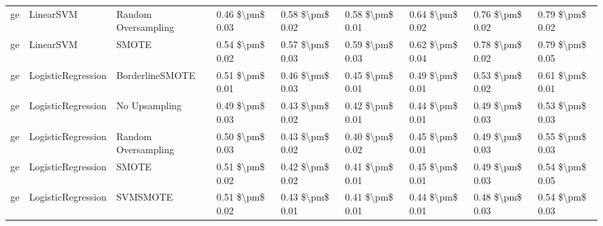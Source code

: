 \begin{tabular}{lllllllll}
      ge &                       LinearSVM &           Random Oversampling &     0.46 \$\textbackslash pm\$ 0.03 &           0.58 \$\textbackslash pm\$ 0.02 &       0.58 \$\textbackslash pm\$ 0.01 &        0.64 \$\textbackslash pm\$ 0.02 &                         0.76 \$\textbackslash pm\$ 0.02 &     0.79 \$\textbackslash pm\$ 0.02 \\
      ge &                       LinearSVM &                         SMOTE &     0.54 \$\textbackslash pm\$ 0.02 &           0.57 \$\textbackslash pm\$ 0.03 &       0.59 \$\textbackslash pm\$ 0.03 &        0.62 \$\textbackslash pm\$ 0.04 &                         0.78 \$\textbackslash pm\$ 0.02 &     0.79 \$\textbackslash pm\$ 0.05 \\
      ge &              LogisticRegression &               BorderlineSMOTE &     0.51 \$\textbackslash pm\$ 0.01 &           0.46 \$\textbackslash pm\$ 0.03 &       0.45 \$\textbackslash pm\$ 0.01 &        0.49 \$\textbackslash pm\$ 0.01 &                         0.53 \$\textbackslash pm\$ 0.02 &     0.61 \$\textbackslash pm\$ 0.01 \\
      ge &              LogisticRegression &                 No Upsampling &     0.49 \$\textbackslash pm\$ 0.03 &           0.43 \$\textbackslash pm\$ 0.02 &       0.42 \$\textbackslash pm\$ 0.01 &        0.44 \$\textbackslash pm\$ 0.01 &                         0.49 \$\textbackslash pm\$ 0.03 &     0.53 \$\textbackslash pm\$ 0.03 \\
      ge &              LogisticRegression &           Random Oversampling &     0.50 \$\textbackslash pm\$ 0.03 &           0.43 \$\textbackslash pm\$ 0.02 &       0.40 \$\textbackslash pm\$ 0.02 &        0.45 \$\textbackslash pm\$ 0.01 &                         0.49 \$\textbackslash pm\$ 0.03 &     0.55 \$\textbackslash pm\$ 0.03 \\
      ge &              LogisticRegression &                         SMOTE &     0.51 \$\textbackslash pm\$ 0.02 &           0.42 \$\textbackslash pm\$ 0.02 &       0.41 \$\textbackslash pm\$ 0.01 &        0.45 \$\textbackslash pm\$ 0.01 &                         0.49 \$\textbackslash pm\$ 0.03 &     0.54 \$\textbackslash pm\$ 0.05 \\
      ge &              LogisticRegression &                      SVMSMOTE &     0.51 \$\textbackslash pm\$ 0.02 &           0.43 \$\textbackslash pm\$ 0.01 &       0.41 \$\textbackslash pm\$ 0.01 &        0.44 \$\textbackslash pm\$ 0.01 &                         0.48 \$\textbackslash pm\$ 0.03 &     0.54 \$\textbackslash pm\$ 0.03 \\

\end{tabular}
